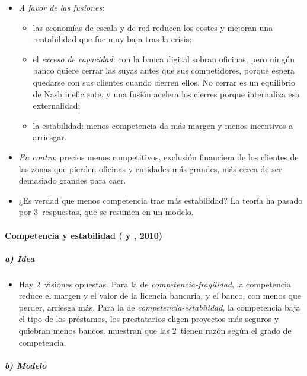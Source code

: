 \documentclass[11pt]{article}
\begin{document}
\begin{itemize}
\item \emph{A favor de las fusiones}:
  \begin{itemize}
  \item las economías de escala y de red reducen los costes y mejoran una rentabilidad que fue muy baja tras la crisis\nocite{NadaEsGratisConcentracion};
  \item el \emph{exceso de capacidad}: con la banca digital sobran oficinas, pero ningún banco quiere cerrar las suyas antes que sus competidores, porque espera quedarse con sus clientes cuando cierren ellos. No cerrar es un equilibrio de Nash ineficiente, y una fusión acelera los cierres porque internaliza esa externalidad\nocite{Vives2020Fusiones};
  \item la estabilidad: menos competencia da más margen y menos incentivos a arriesgar.
  \end{itemize}
\item \emph{En contra}: precios menos competitivos, exclusión financiera de los clientes de las zonas que pierden oficinas y entidades más grandes, más cerca de ser demasiado grandes para caer.
\item ¿Es verdad que menos competencia trae más estabilidad? La teoría ha pasado por 3~respuestas, que se resumen en un modelo.
\end{itemize}

\paragraph{Competencia y estabilidad ( y , 2010)}

\subparagraph{a) Idea}

\begin{itemize}
\item Hay 2~visiones opuestas. Para la de \emph{competencia-fragilidad}, la competencia reduce el margen y el valor de la licencia bancaria, y el banco, con menos que perder, arriesga más\nocite{Keeley1990}. Para la de \emph{competencia-estabilidad}, la competencia baja el tipo de los préstamos, los prestatarios eligen proyectos más seguros y quiebran menos bancos\nocite{BoydDeNicolo2005}. \textcite{MartinezMieraRepullo2010} muestran que las 2~tienen razón según el grado de competencia.
\end{itemize}

\subparagraph{b) Modelo}
\end{document}
